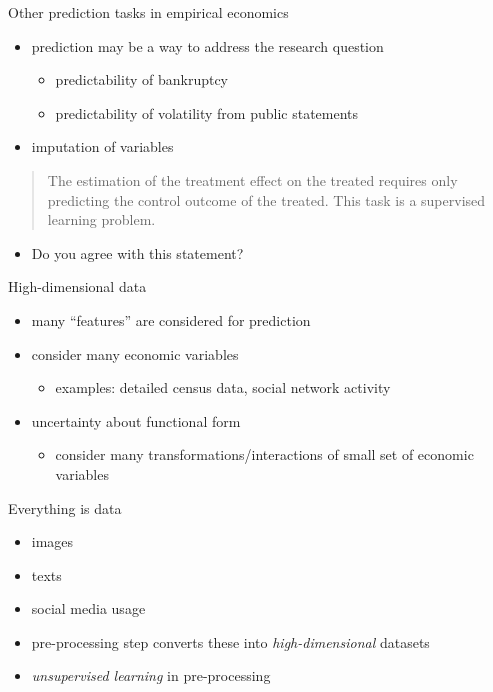 \documentclass[xcolor=dvipsnames, handout]{beamer}
\begin{document}
\begin{frame}{Other prediction tasks in empirical economics}
\begin{itemize}
  \item 
  prediction may be a way to address the research question
  \begin{itemize}
    \item predictability of bankruptcy \parencite{becerra2005neural}
    \item predictability of volatility from public statements \parencite{kogan2009predicting}
  \end{itemize}
  \item 
  imputation of variables
\end{itemize}
\pause
\begin{quote}
The estimation of the treatment effect on the treated requires only predicting the control outcome of the treated. 
This task is a supervised learning problem.
\end{quote}
\begin{itemize}
  \item Do you agree with this statement?
\end{itemize}
\end{frame}


\begin{frame}{High-dimensional data}
\begin{itemize}
  \item many ``features'' are considered for prediction
  \item consider many economic variables 
  \begin{itemize}
    \item examples: detailed census data, social network activity
  \end{itemize}
  \item uncertainty about functional form 
  \begin{itemize}
    \item consider many transformations/interactions of small set of economic variables
  \end{itemize}
\end{itemize}
\end{frame}


\begin{frame}{Everything is data}
\begin{itemize}
  \item images 
  \item texts 
  \item social media usage 
  \item pre-processing step converts these into \emph{high-dimensional} datasets
  \item \emph{unsupervised learning} in pre-processing  
\end{itemize}
\end{frame}
\end{document}
